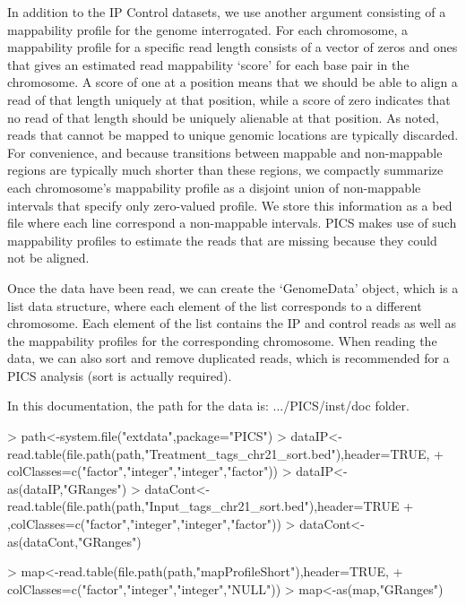 \documentclass[a4paper]{article}
\begin{document}
In addition to the IP Control datasets, we use another argument consisting of a mappability profile for the genome interrogated. For each chromosome, a mappability profile for a specific read length consists of a vector of zeros and ones that gives an estimated read mappability `score' for each base pair in the chromosome. A score of one at a position means that we should be able to align a read of that length uniquely at that position, while a score of zero indicates that no read of that length should be uniquely alienable at that position. As noted, reads that cannot be mapped to unique genomic locations are typically discarded. For convenience, and because transitions between mappable and non-mappable regions are typically much shorter than these regions, we compactly summarize each chromosome's mappability profile as a disjoint union of non-mappable intervals that specify only zero-valued profile. We store this information as a bed file where each line correspond a non-mappable intervals. PICS makes use of such mappability profiles to estimate the reads that are missing because they could not be aligned. 

Once the data have been read, we can create the `GenomeData' object, which is a list data structure, where each element of the list corresponds to a different chromosome. Each element of the list contains the IP and control reads as well as the mappability profiles for the corresponding chromosome. When reading the data, we can also sort and remove duplicated reads, which is recommended for a PICS analysis (sort is actually required).


In this documentation, the path for the data is:  .../PICS/inst/doc folder.
\begin{Schunk}
\begin{Sinput}
> path<-system.file("extdata",package="PICS")
> dataIP<-read.table(file.path(path,"Treatment_tags_chr21_sort.bed"),header=TRUE,
+ colClasses=c("factor","integer","integer","factor"))
> dataIP<-as(dataIP,"GRanges")
> dataCont<-read.table(file.path(path,"Input_tags_chr21_sort.bed"),header=TRUE
+ ,colClasses=c("factor","integer","integer","factor"))
> dataCont<-as(dataCont,"GRanges")
\end{Sinput}
\end{Schunk}

\begin{Schunk}
\begin{Sinput}
> map<-read.table(file.path(path,"mapProfileShort"),header=TRUE,
+ colClasses=c("factor","integer","integer","NULL"))
> map<-as(map,"GRanges")
\end{Sinput}
\end{Schunk}
\end{document}
